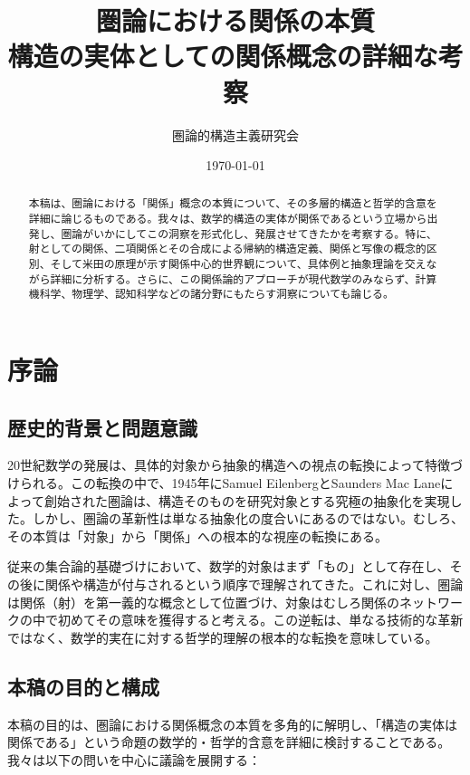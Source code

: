 \documentclass[11pt,a4paper,twocolumn]{ltjsarticle}
\title{圏論における関係の本質\\
\large 構造の実体としての関係概念の詳細な考察}
\author{圏論的構造主義研究会}
\date{\today}
\theoremstyle{definition}
\theoremstyle{plain}
\begin{document}
\maketitle

\begin{abstract}
本稿は、圏論における「関係」概念の本質について、その多層的構造と哲学的含意を詳細に論じるものである。我々は、数学的構造の実体が関係であるという立場から出発し、圏論がいかにしてこの洞察を形式化し、発展させてきたかを考察する。特に、射としての関係、二項関係とその合成による帰納的構造定義、関係と写像の概念的区別、そして米田の原理が示す関係中心的世界観について、具体例と抽象理論を交えながら詳細に分析する。さらに、この関係論的アプローチが現代数学のみならず、計算機科学、物理学、認知科学などの諸分野にもたらす洞察についても論じる。
\end{abstract}

\vspace{1em}

\section{序論}

\subsection{歴史的背景と問題意識}

20世紀数学の発展は、具体的対象から抽象的構造への視点の転換によって特徴づけられる。この転換の中で、1945年にSamuel EilenbergとSaunders Mac Laneによって創始された圏論は、構造そのものを研究対象とする究極の抽象化を実現した。しかし、圏論の革新性は単なる抽象化の度合いにあるのではない。むしろ、その本質は「対象」から「関係」への根本的な視座の転換にある。

従来の集合論的基礎づけにおいて、数学的対象はまず「もの」として存在し、その後に関係や構造が付与されるという順序で理解されてきた。これに対し、圏論は関係（射）を第一義的な概念として位置づけ、対象はむしろ関係のネットワークの中で初めてその意味を獲得すると考える。この逆転は、単なる技術的な革新ではなく、数学的実在に対する哲学的理解の根本的な転換を意味している。

\subsection{本稿の目的と構成}

本稿の目的は、圏論における関係概念の本質を多角的に解明し、「構造の実体は関係である」という命題の数学的・哲学的含意を詳細に検討することである。我々は以下の問いを中心に議論を展開する：
\end{document}
